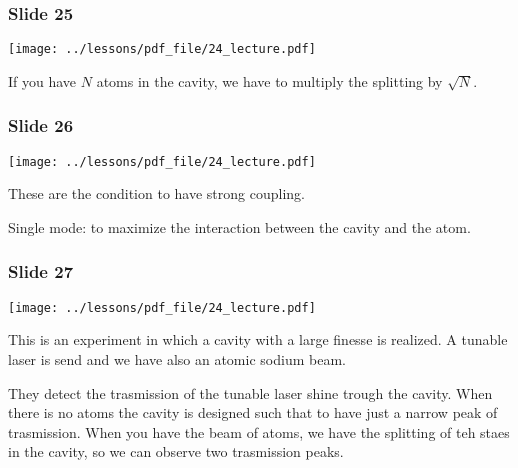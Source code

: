 \documentclass[../main/main.tex]{subfiles}
\begin{document}
\subsubsection*{Slide 25}

\begin{minipage}[]{0.5\linewidth}
\centering
\texttt{[image: ../lessons/pdf\_file/24\_lecture.pdf]}
\end{minipage}
\hspace{0.3cm}\vspace{0.3cm}
\begin{minipage}[c]{0.47\linewidth}

If you have \( N \) atoms in the cavity, we have to multiply the splitting by \( \sqrt{N}  \).

\end{minipage}

\subsubsection*{Slide 26}

\begin{minipage}[]{0.5\linewidth}
\centering
\texttt{[image: ../lessons/pdf\_file/24\_lecture.pdf]}
\end{minipage}
\hspace{0.3cm}\vspace{0.3cm}
\begin{minipage}[c]{0.47\linewidth}

These are the condition to have strong coupling.

Single mode: to maximize the interaction between the cavity and the atom.

\end{minipage}

\subsubsection*{Slide 27}

\begin{minipage}[]{0.5\linewidth}
\centering
\texttt{[image: ../lessons/pdf\_file/24\_lecture.pdf]}
\end{minipage}
\hspace{0.3cm}\vspace{0.3cm}
\begin{minipage}[c]{0.47\linewidth}

This is an experiment in which a cavity with a large finesse is realized. A tunable laser is send and we have also an atomic sodium beam.

They detect the trasmission of the tunable laser shine trough the cavity. When there is no atoms the cavity is designed such that to have just a narrow peak of trasmission. When you have the beam of atoms, we have the splitting of teh staes in the cavity, so we can observe two trasmission peaks.

\end{minipage}
\end{document}
